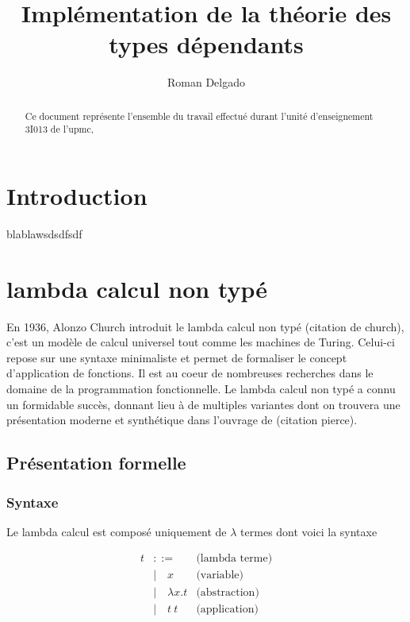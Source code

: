 \documentclass {article}
\title{Implémentation de la théorie des types dépendants}
\author{Roman Delgado}
\date{}
\theoremstyle{definition}
\theoremstyle{remark}
\begin{document}
\maketitle




\begin{abstract} 
  Ce document représente l'ensemble du travail effectué durant l'unité d'enseignement 3I013 de l'upmc,
\end{abstract}

\tableofcontents

\clearpage


\section{Introduction}

blablawsdsdfsdf

\section{lambda calcul non typé}

En 1936, Alonzo Church introduit le lambda calcul non typé
(citation de church), c'est
un modèle de calcul universel tout comme les machines de Turing. Celui-ci repose
sur une syntaxe minimaliste et permet de formaliser le concept d'application 
de fonctions. Il est au coeur de nombreuses recherches dans le domaine de la 
programmation fonctionnelle. Le lambda calcul non typé a connu un formidable 
succès, donnant lieu à de multiples variantes dont on trouvera une présentation
 moderne et synthétique dans l'ouvrage de (citation pierce).

\subsection{Présentation formelle}

\subsubsection{Syntaxe}
Le lambda calcul est composé uniquement de \(\lambda\) termes dont voici la syntaxe

\begin{align*}
  t &::= & \mbox{(lambda terme)} \\
  &|\quad x & \mbox{(variable)} \\
  &|\quad \lambda x. t & \mbox{(abstraction)} \\
  &|\quad t\: t          & \mbox{(application)}
\end{align*}
\end{document}
